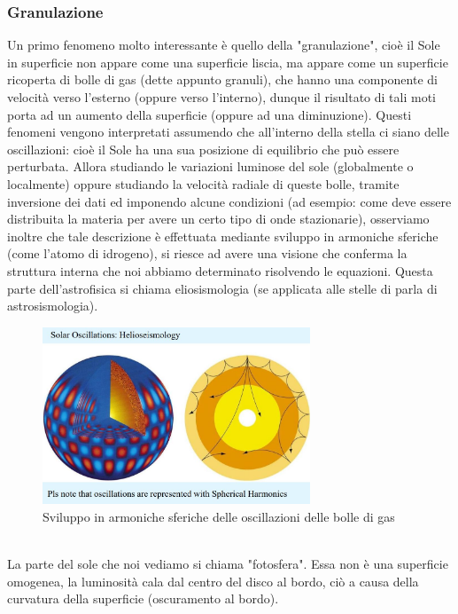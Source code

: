 \documentclass[a4paper,11pt]{article}
\begin{document}
    \subsubsection{Granulazione}
        Un primo fenomeno molto interessante è quello della "granulazione", cioè il Sole in superficie non appare come una superficie liscia, ma appare come un superficie ricoperta di bolle di gas (dette appunto granuli), che hanno una componente di velocità verso l'esterno (oppure verso l'interno), dunque il risultato di tali moti porta ad un aumento della superficie (oppure ad una diminuzione).
        Questi fenomeni vengono interpretati assumendo che all'interno della stella ci siano delle oscillazioni: cioè il Sole ha una sua posizione di equilibrio che può essere perturbata.
        Allora studiando le variazioni luminose del sole (globalmente o localmente) oppure studiando la velocità radiale di queste bolle, tramite inversione dei dati ed imponendo alcune condizioni (ad esempio: come deve essere distribuita la materia per avere un certo tipo di onde stazionarie), osserviamo inoltre che tale descrizione è effettuata mediante sviluppo in armoniche sferiche (come l'atomo di idrogeno), si riesce ad avere una visione che conferma la struttura interna che noi abbiamo determinato risolvendo le equazioni.
        Questa parte dell'astrofisica si chiama eliosismologia (se applicata alle stelle di parla di astrosismologia).
        \\
        \begin{figure}[h!!]
            \centering
                \includegraphics[width=8cm]{2dic/Eliosismologia.jpg}
                \caption{Sviluppo in armoniche sferiche delle oscillazioni delle bolle di gas}
            \label{fig:Eliosism}
        \end{figure}
        \\
        \newpage
        La parte del sole che noi vediamo si chiama "fotosfera".
        Essa non è una superficie omogenea, la luminosità cala dal centro del disco al bordo, ciò a causa della curvatura della superficie (oscuramento al bordo).
\end{document}
